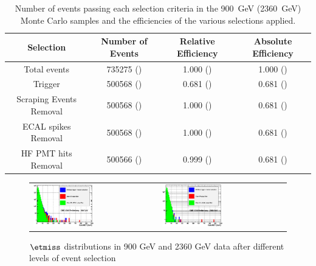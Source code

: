 \begin{table}[!ht]
  \begin{center}
    \begin{tabular}{|c|c|c|c|}
      \hline
      Selection      & Number of Events  & Relative Efficiency   &
      Absolute Efficiency\\
      \hline\hline
      Total events                    & 735275 () &  1.000 () & 1.000 ()         \\
      Trigger                            & 500568 () & 0.681 ()& 0.681 () \\ 
      Scraping Events Removal& 500568 () & 1.000 () & 0.681 () \\
      ECAL spikes Removal     & 500568 () & 1.000 () & 0.681 () \\ 
      HF PMT hits Removal      & 500566 () & 0.999 () & 0.681 ()\\ \hline
 \end{tabular}
    \caption{Number of events passing each selection criteria in the 900~GeV (2360~GeV) Monte Carlo samples and
      the efficiencies of the various selections applied.}
    \label{tab:selectionefficiency_mc}
  \end{center}
\end{table}

\begin{figure}[h!]
 \centering
 \begin{tabular}{ll}
  \includegraphics[width=0.5\textwidth]{plots_EventSelection/calometPt_afterFilters_900.eps} &
  \includegraphics[width=0.5\textwidth]{plots_EventSelection/calometPt_afterFilters_2360.eps} \\
 \end{tabular}
 \caption{$\etmiss$ distributions in 900 GeV and 2360 GeV data after different levels of event selection ~\label{fig:calometAfterCuts}}
\end{figure}

